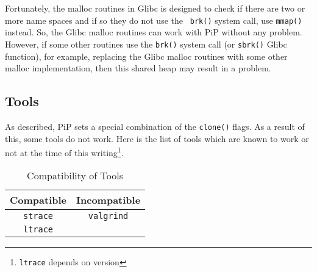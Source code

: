 Fortunately, the malloc routines in Glibc is designed to check if
there are two or more name spaces and if so they do not use the {\tt
  brk()} system call, use {\tt mmap()} instead. So, the Glibc malloc
routines can work with PiP without any problem. However, if some other 
routines use the {\tt brk()} system call (or {\tt sbrk()} Glibc
function), for example, replacing the Glibc malloc routines with some
other malloc implementation, then this shared heap may result in a
problem. 

\subsection{Tools}

As described, PiP sets a special combination of the {\tt clone()}
flags. As a result of this, some tools do not work. Here is the list
of tools which are known to work or not at the time of this
writing\footnote{{\tt ltrace} depends on version}. 

\begin{table}[ht]
  \centering
  \caption{Compatibility of Tools}
  \vspace{3mm}
  \begin{tabular}{c|c}
    \hline
    Compatible & Incompatible \\
    \hline
    {\tt strace} & {\tt valgrind} \\
    {\tt ltrace} \\
    \hline
  \end{tabular}
  \end{table}
